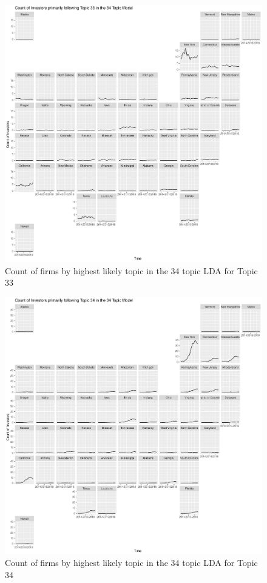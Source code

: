 \begin{figure}
	\centering
	\includegraphics[width=1\linewidth]{Figures/ChapterV/USA_34_Topic33.pdf}
	\caption[Count of firm for Topic 33 by quarter]{Count of firms by highest likely topic in the 34 topic LDA for Topic 33}
	\label{fig:StateLDA33}
\end{figure}

\begin{figure}
	\centering
	\includegraphics[width=1\linewidth]{Figures/ChapterV/USA_34_Topic34.pdf}
	\caption[Count of firm for Topic 34 by quarter]{Count of firms by highest likely topic in the 34 topic LDA for Topic 34}
	\label{fig:StateLDA34}
\end{figure}

